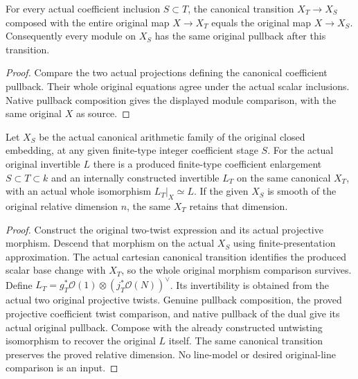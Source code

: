 \begin{lemma}
\label{lem:kn-arithmetic-original-line-transition}
\leanok
For every actual coefficient inclusion $S\subset T$, the canonical
transition $X_T\to X_S$ composed with the entire original map
$X\to X_T$ equals the original map $X\to X_S$.  Consequently every
module on $X_S$ has the same original pullback after this transition.
\end{lemma}
\begin{proof}
Compare the two actual projections defining the canonical coefficient
pullback.  Their whole original equations agree under the actual scalar
inclusions.  Native pullback composition gives the displayed module
comparison, with the same original $X$ as source.
\end{proof}

\begin{theorem}
\label{thm:kn-arithmetic-original-line-model}
\leanok
{}
Let $X_S$ be the actual canonical arithmetic family of the original closed
embedding, at any given finite-type integer coefficient stage $S$.
For the actual original invertible $L$ there is a produced finite-type
coefficient enlargement $S\subset T\subset k$ and an internally
constructed invertible $L_T$ on the same canonical $X_T$, with an actual
whole isomorphism $L_T|_X\simeq L$.  If the given $X_S$ is smooth of the
original relative dimension $n$, the same $X_T$ retains that dimension.
\end{theorem}
\begin{proof}
Construct the original two-twist expression and its actual projective
morphism.  Descend that morphism on the actual $X_S$ using finite-presentation
approximation.  The actual cartesian canonical transition identifies the
produced scalar base change with $X_T$, so the whole original morphism
comparison survives.  Define
$L_T=g_T^*\mathcal O(1)\otimes(j_T^*\mathcal O(N))^\vee$.
Its invertibility is obtained from the actual two original projective
twists.  Genuine pullback composition, the proved projective coefficient
twist comparison, and native pullback of the dual give its actual original
pullback.  Compose with the already constructed untwisting isomorphism to
recover the original $L$ itself.  The same canonical transition preserves
the proved relative dimension.  No line-model or desired
original-line comparison is an input.
\end{proof}

